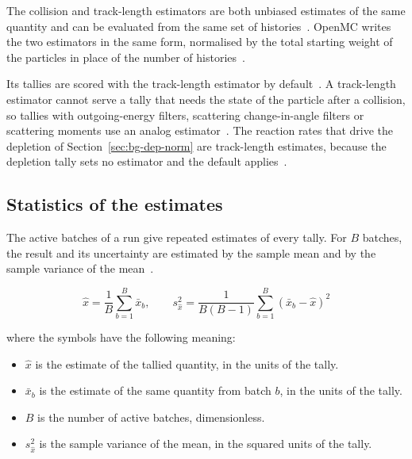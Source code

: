 The collision and track-length estimators are both unbiased estimates of the same quantity and can be evaluated
from the same set of histories~\cite{lux_koblinger_1991}. OpenMC writes
the two estimators in the same form, normalised by the total starting
weight of the particles in place of the number of
histories~\cite{openmc_docs}.

Its tallies are scored with the
track-length estimator by default~\cite{romano_openmc_2015}. A
track-length estimator cannot serve a tally that needs the state of the
particle after a collision, so tallies with outgoing-energy filters,
scattering change-in-angle filters or scattering moments use an analog
estimator~\cite{openmc_docs}. The reaction rates
that drive the depletion of Section~\ref{sec:bg-dep-norm} are
track-length estimates, because the depletion tally sets no estimator
and the default applies~\cite{romano_2021_depletion,openmc_docs}.

\subsection{Statistics of the estimates}
\label{sec:bg-mc-stats}

The active batches of a run give repeated estimates of every tally. For
$B$ batches, the result and its uncertainty are estimated by the sample
mean and by the sample variance of the mean~\cite{lux_koblinger_1991}.

\begin{equation}
\hat{x} = \frac{1}{B}\sum_{b=1}^{B}\bar{x}_b,
\qquad
s_{\hat{x}}^2 = \frac{1}{B(B-1)}\sum_{b=1}^{B}
\left(\bar{x}_b - \hat{x}\right)^2
\label{eq:mc-mean-var}
\end{equation}

\noindent where the symbols have the following meaning:

\begin{itemize}
  \item $\hat{x}$ is the estimate of the tallied quantity, in the units
        of the tally.

  \item $\bar{x}_b$ is the estimate of the same quantity from batch $b$,
        in the units of the tally.

  \item $B$ is the number of active batches, dimensionless.

  \item $s_{\hat{x}}^2$ is the sample variance of the mean, in the
        squared units of the tally.
\end{itemize}

